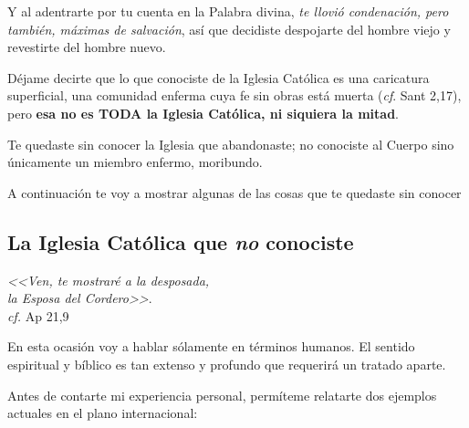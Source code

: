 \documentclass{article}
\begin{document}
Y al adentrarte por tu cuenta en la Palabra divina, \emph{te llovi\'o condenaci\'on, pero tambi\'en, m\'aximas de salvaci\'on}, as\'{i} que decidiste despojarte del hombre viejo y revestirte del hombre nuevo.

D\'ejame decirte que lo que conociste de la Iglesia Cat\'olica es una caricatura superficial, una comunidad enferma cuya fe sin obras est\'a muerta (\emph{cf}. Sant 2,17), pero \textbf{esa no es TODA la Iglesia Cat\'olica, ni siquiera la mitad}.

Te quedaste sin conocer la Iglesia que abandonaste; no conociste al Cuerpo sino \'unicamente un miembro enfermo, moribundo.

A continuaci\'on te voy a mostrar algunas de las cosas que te quedaste sin conocer

\subsection{La Iglesia Cat\'olica que \emph{no} conociste}

\begin{flushright}
\emph{<<Ven, te mostrar\'e a la desposada,\\
la Esposa del Cordero>>}.\\
\emph{cf.} Ap 21,9
\end{flushright}

\noindent
En esta ocasi\'on voy a hablar s\'olamente en t\'erminos humanos. El sentido espiritual y b\'{i}blico es tan extenso y profundo que requerirá un tratado aparte.

Antes de contarte mi experiencia personal, perm\'{i}teme relatarte dos ejemplos actuales en el plano internacional:
\end{document}
